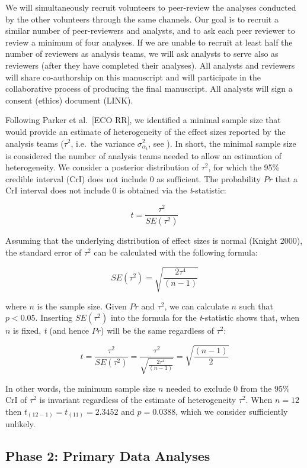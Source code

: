 \documentclass[
  12pt,
]{article}
\begin{document}
We will simultaneously recruit volunteers to peer-review the analyses conducted by the other volunteers through the same channels.
Our goal is to recruit a similar number of peer-reviewers and analysts, and to ask each peer reviewer to review a minimum of four analyses.
If we are unable to recruit at least half the number of reviewers as analysis teams, we will ask analysts to serve also as reviewers (after they have completed their analyses).
All analysts and reviewers will share co-authorship on this manuscript and will participate in the collaborative process of producing the final manuscript.
All analysts will sign a consent (ethics) document (LINK).

Following Parker et al.~{[}ECO RR{]}, we identified a minimal sample size that would provide an estimate of heterogeneity of the effect sizes reported by the analysis teams (\(\tau^2\), i.e.~the variance \(\sigma^2_{\alpha_{\text{t}}}\), see ).
In short, the minimal sample size is considered the number of analysis teams needed to allow an estimation of heterogeneity.
We consider a posterior distribution of \(\tau^2\), for which the 95\% credible interval (CrI) does not include 0 as sufficient.
The probability \(Pr\) that a CrI interval does not include 0 is obtained via the \emph{t}-statistic:

\[t = \frac{\tau^2}{SE(\tau^2)}\]

Assuming that the underlying distribution of effect sizes is normal (Knight 2000), the standard error of \(\tau^2\) can be calculated with the following formula:

\[SE(\tau^2) = \sqrt{\frac{2\tau^4}{(n-1)}}\]

where \(n\) is the sample size.
Given \(Pr\) and \(\tau^2\), we can calculate \(n\) such that \(p < 0.05\).
Inserting \(SE(\tau^2)\) into the formula for the \emph{t}-statistic shows that, when \(n\) is fixed, \emph{t} (and hence \(Pr\)) will be the same regardless of \(\tau^2\):

\[t = \frac{\tau^2}{SE(\tau^2)} = \frac{\tau^2}{\sqrt{\frac{2\tau^4}{(n-1)}}} = \sqrt{\frac{(n-1)}{2}}\]

In other words, the minimum sample size \(n\) needed to exclude 0 from the 95\% CrI of \(\tau^2\) is invariant regardless of the estimate of heterogeneity \(\tau^2\).
When \(n = 12\) then \(t_{(12-1)} = t_{(11)} = 2.3452\) and \(p = 0.0388\), which we consider sufficiently unlikely.

\hypertarget{phase-2-primary-data-analyses}{%
\subsection{Phase 2: Primary Data Analyses}\label{phase-2-primary-data-analyses}}
\end{document}
